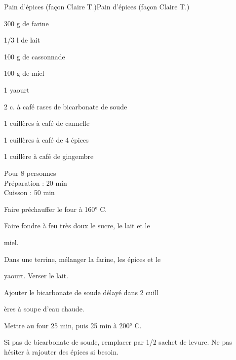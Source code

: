 \begin{recette}{Pain d'épices (façon Claire T.)}{Pain d'épices (façon Claire T.)}

\begin{ingredients}
300 g de farine\par
1/3 l de lait\par
100 g de cassonnade\par
100 g de miel\par
1 yaourt\par
2 c. à café rases de bicarbonate de soude\par
1 cuillères à café de cannelle\par
1 cuillères à café de 4 épices\par
1 cuillère à café de gingembre\par
\end{ingredients}

\begin{infos}
Pour 8 personnes\\
Préparation : 20 min\\
Cuisson : 50 min\\
\end{infos}

\begin{etapes}
\item Faire préchauffer le four à 160° C.
\item Faire fondre à feu très doux le sucre, le lait et le
\item miel.
\item Dans une terrine, mélanger la farine, les épices et le
\item yaourt. Verser le lait.
\item Ajouter le bicarbonate de soude délayé dans 2 cuill
\item ères à soupe d'eau chaude.
\item Mettre au four 25 min, puis 25 min à 200° C.
\end{etapes}

\begin{conseils}
Si pas de bicarbonate de soude, remplacer par 1/2 sachet de levure.
Ne pas hésiter à rajouter des épices si besoin.
\end{conseils}

\end{recette}